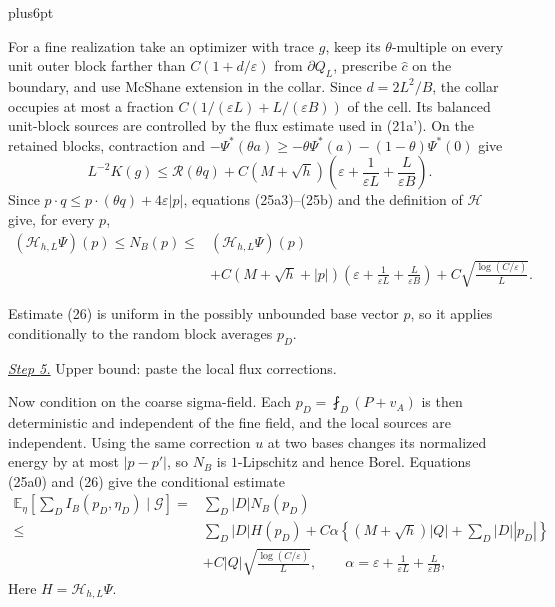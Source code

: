 \documentclass[11pt,reqno]{amsart}
\makeatletter
\theoremstyle{plain}
\theoremstyle{definition}
\theoremstyle{remark}
\renewenvironment{proof}[1][\proofname]{%
  \par
  \pushQED{\qed}%
  \normalfont
  \topsep6pt plus6pt\relax
  \trivlist
  \item[\hskip\labelsep\slshape #1\@addpunct{.}]%
  \ignorespaces
}{%
  \popQED
  \endtrivlist
  \@endpefalse
}
\DeclareRobustCommand{\qed}{%
  \leavevmode\unskip\penalty9999\hbox{}\nobreak
  \ifmmode
    \makebox[0pt][l]{\qquad\hbox{\qedsymbol}}%
  \else
    \qquad\hbox{\qedsymbol}%
  \fi
}
\renewcommand{\qedsymbol}{\rule[.47pt]{4pt}{6pt}}
\numberwithin{equation}{section}
\newcommand{\1}{\mathbf 1}
\makeatother
\begin{document}
\begin{proof}
For a fine realization take an optimizer with trace $g$, keep its
$\theta$-multiple on every unit outer block farther than
$C(1+d/\varepsilon)$ from $\partial Q_ L$, prescribe
$\widehat c$ on the boundary, and use McShane extension in the collar.
Since $d=2L^2/B$, the collar occupies at most a fraction
$C(1/(\varepsilon L)+L/(\varepsilon B))$ of the cell.  Its balanced
unit-block sources are controlled by the flux estimate used in (21a').
On the retained blocks, contraction and
$-\Psi^*(\theta a)\geq-\theta\Psi^*(a)
-(1-\theta)\Psi^*(0)$ give
\begin{equation}
L^{-2}K(g)\leq \mathcal R(\theta q)+C(M+\sqrt h)
\left(\varepsilon+\frac1{\varepsilon L}
+\frac L{\varepsilon B}\right).
\tag{25b}
\end{equation}
Since $p\cdot q\leq p\cdot(\theta q)+4\varepsilon|p|$, equations
(25a3)--(25b) and the definition of $\mathcal H$ give, for every $p$,
\begin{equation}
\boxed{\begin{aligned}
(\mathcal H_ {h,L}\Psi)(p)\leq N_ B(p)
\leq{}&(\mathcal H_ {h,L}\Psi)(p)\\
&+C(M+\sqrt h+|p|)
\left(\varepsilon+\frac1{\varepsilon L}
+\frac L{\varepsilon B}\right)
+C\sqrt{\frac{\log(C/\varepsilon)}L}.
\end{aligned}}
\tag{26}
\end{equation}

Estimate (26) is uniform in the possibly unbounded base vector $p$,
so it applies conditionally to the random block averages $p_D$.

\smallskip\noindent
\underline{\textit{Step 5.}} Upper bound: paste the local flux corrections.

Now condition on the coarse sigma-field.  Each
$p_ D=\fint_ D(P+v_ A)$ is then deterministic and independent of the
fine field, and the local sources are independent.  Using the same
correction $u$ at two bases changes its normalized energy by at most
$|p-p'|$, so $N_ B$ is $1$-Lipschitz and hence Borel.  Equations
(25a0) and (26) give the conditional estimate
\begin{equation}
\begin{split}
\mathbb E_ \eta\!\left[\sum_ DI_ B(p_ D,\eta_ D)\mid\mathscr G\right]
={}&\sum_ D|D|N_ B(p_ D)\\
\leq{}&\sum_ D|D|H(p_ D)
+C\alpha\left\{(M+\sqrt h)|Q|+\sum_ D|D||p_ D|\right\}\\
&+C|Q|\sqrt{\frac{\log(C/\varepsilon)}L},\qquad
\alpha=\varepsilon+\frac1{\varepsilon L}
+\frac L{\varepsilon B},               
\end{split}
\tag{26i}
\end{equation}
Here $H=\mathcal H_ {h,L}\Psi$.


\end{proof}
\end{document}
